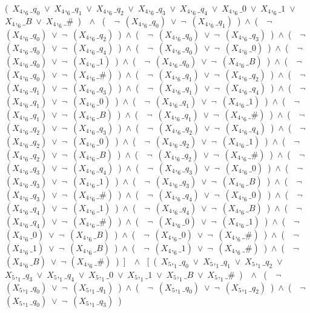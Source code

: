 ﻿\documentclass[a4paper,10pt]{article}
\begin{document}
(\ $X_4,_6\_q_0$\ $\vee$\ $X_4,_6\_q_1$\ $\vee$\ $X_4,_6\_q_2$\ $\vee$\ $X_4,_6\_q_3$\ $\vee$\ $X_4,_6\_q_4$\ $\vee$\ $X_4,_6\_0$\ $\vee$\ $X_4,_6\_1$\ $\vee$\ $X_4,_6\_B$\ $\vee$\ $X_4,_6\_\#$\ )\ \ $\wedge$ \ (\ \ $\neg$\ $(X_4,_6\_q_0)$\ $\vee$\ $\neg$\ $(X_4,_6\_q_1)$\ )\ $\wedge$\ (\ \ $\neg$\ $(X_4,_6\_q_0)$\ $\vee$\ $\neg$\ $(X_4,_6\_q_2)$\ )\ $\wedge$\ (\ \ $\neg$\ $(X_4,_6\_q_0)$\ $\vee$\ $\neg$\ $(X_4,_6\_q_3)$\ )\ $\wedge$\ (\ \ $\neg$\ $(X_4,_6\_q_0)$\ $\vee$\ $\neg$\ $(X_4,_6\_q_4)$\ )\ $\wedge$\ (\ \ $\neg$\ $(X_4,_6\_q_0)$\ $\vee$\ $\neg$\ $(X_4,_6\_0)$\ )\ $\wedge$\ (\ \ $\neg$\ $(X_4,_6\_q_0)$\ $\vee$\ $\neg$\ $(X_4,_6\_1)$\ )\ $\wedge$\ (\ \ $\neg$\ $(X_4,_6\_q_0)$\ $\vee$\ $\neg$\ $(X_4,_6\_B)$\ )\ $\wedge$\ (\ \ $\neg$\ $(X_4,_6\_q_0)$\ $\vee$\ $\neg$\ $(X_4,_6\_\#)$\ )\ $\wedge$\ (\ \ $\neg$\ $(X_4,_6\_q_1)$\ $\vee$\ $\neg$\ $(X_4,_6\_q_2)$\ )\ $\wedge$\ (\ \ $\neg$\ $(X_4,_6\_q_1)$\ $\vee$\ $\neg$\ $(X_4,_6\_q_3)$\ )\ $\wedge$\ (\ \ $\neg$\ $(X_4,_6\_q_1)$\ $\vee$\ $\neg$\ $(X_4,_6\_q_4)$\ )\ $\wedge$\ (\ \ $\neg$\ $(X_4,_6\_q_1)$\ $\vee$\ $\neg$\ $(X_4,_6\_0)$\ )\ $\wedge$\ (\ \ $\neg$\ $(X_4,_6\_q_1)$\ $\vee$\ $\neg$\ $(X_4,_6\_1)$\ )\ $\wedge$\ (\ \ $\neg$\ $(X_4,_6\_q_1)$\ $\vee$\ $\neg$\ $(X_4,_6\_B)$\ )\ $\wedge$\ (\ \ $\neg$\ $(X_4,_6\_q_1)$\ $\vee$\ $\neg$\ $(X_4,_6\_\#)$\ )\ $\wedge$\ (\ \ $\neg$\ $(X_4,_6\_q_2)$\ $\vee$\ $\neg$\ $(X_4,_6\_q_3)$\ )\ $\wedge$\ (\ \ $\neg$\ $(X_4,_6\_q_2)$\ $\vee$\ $\neg$\ $(X_4,_6\_q_4)$\ )\ $\wedge$\ (\ \ $\neg$\ $(X_4,_6\_q_2)$\ $\vee$\ $\neg$\ $(X_4,_6\_0)$\ )\ $\wedge$\ (\ \ $\neg$\ $(X_4,_6\_q_2)$\ $\vee$\ $\neg$\ $(X_4,_6\_1)$\ )\ $\wedge$\ (\ \ $\neg$\ $(X_4,_6\_q_2)$\ $\vee$\ $\neg$\ $(X_4,_6\_B)$\ )\ $\wedge$\ (\ \ $\neg$\ $(X_4,_6\_q_2)$\ $\vee$\ $\neg$\ $(X_4,_6\_\#)$\ )\ $\wedge$\ (\ \ $\neg$\ $(X_4,_6\_q_3)$\ $\vee$\ $\neg$\ $(X_4,_6\_q_4)$\ )\ $\wedge$\ (\ \ $\neg$\ $(X_4,_6\_q_3)$\ $\vee$\ $\neg$\ $(X_4,_6\_0)$\ )\ $\wedge$\ (\ \ $\neg$\ $(X_4,_6\_q_3)$\ $\vee$\ $\neg$\ $(X_4,_6\_1)$\ )\ $\wedge$\ (\ \ $\neg$\ $(X_4,_6\_q_3)$\ $\vee$\ $\neg$\ $(X_4,_6\_B)$\ )\ $\wedge$\ (\ \ $\neg$\ $(X_4,_6\_q_3)$\ $\vee$\ $\neg$\ $(X_4,_6\_\#)$\ )\ $\wedge$\ (\ \ $\neg$\ $(X_4,_6\_q_4)$\ $\vee$\ $\neg$\ $(X_4,_6\_0)$\ )\ $\wedge$\ (\ \ $\neg$\ $(X_4,_6\_q_4)$\ $\vee$\ $\neg$\ $(X_4,_6\_1)$\ )\ $\wedge$\ (\ \ $\neg$\ $(X_4,_6\_q_4)$\ $\vee$\ $\neg$\ $(X_4,_6\_B)$\ )\ $\wedge$\ (\ \ $\neg$\ $(X_4,_6\_q_4)$\ $\vee$\ $\neg$\ $(X_4,_6\_\#)$\ )\ $\wedge$\ (\ \ $\neg$\ $(X_4,_6\_0)$\ $\vee$\ $\neg$\ $(X_4,_6\_1)$\ )\ $\wedge$\ (\ \ $\neg$\ $(X_4,_6\_0)$\ $\vee$\ $\neg$\ $(X_4,_6\_B)$\ )\ $\wedge$\ (\ \ $\neg$\ $(X_4,_6\_0)$\ $\vee$\ $\neg$\ $(X_4,_6\_\#)$\ )\ $\wedge$\ (\ \ $\neg$\ $(X_4,_6\_1)$\ $\vee$\ $\neg$\ $(X_4,_6\_B)$\ )\ $\wedge$\ (\ \ $\neg$\ $(X_4,_6\_1)$\ $\vee$\ $\neg$\ $(X_4,_6\_\#)$\ )\ $\wedge$\ (\ \ $\neg$ $(X_4,_6\_B)$\ $\vee$\ $\neg$ $(X_4,_6\_\#)$\ )\ ]\ \ $\wedge$ \ [\ (\ $X_5,_1\_q_0$\ $\vee$\ $X_5,_1\_q_1$\ $\vee$\ $X_5,_1\_q_2$\ $\vee$\ $X_5,_1\_q_3$\ $\vee$\ $X_5,_1\_q_4$\ $\vee$\ $X_5,_1\_0$\ $\vee$\ $X_5,_1\_1$\ $\vee$\ $X_5,_1\_B$\ $\vee$\ $X_5,_1\_\#$\ )\ \ $\wedge$ \ (\ \ $\neg$\ $(X_5,_1\_q_0)$\ $\vee$\ $\neg$\ $(X_5,_1\_q_1)$\ )\ $\wedge$\ (\ \ $\neg$\ $(X_5,_1\_q_0)$\ $\vee$\ $\neg$\ $(X_5,_1\_q_2)$\ )\ $\wedge$\ (\ \ $\neg$\ $(X_5,_1\_q_0)$\ $\vee$\ $\neg$\ $(X_5,_1\_q_3)$\ )\ 
\end{document}
